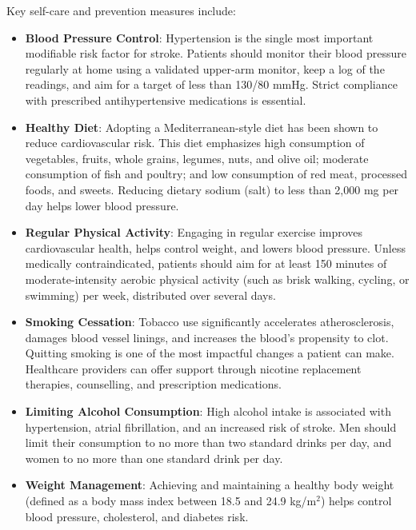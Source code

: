 Key self-care and prevention measures include:

\begin{itemize}
    \item \textbf{Blood Pressure Control}: Hypertension is the single most important modifiable risk factor for stroke. Patients should monitor their blood pressure regularly at home using a validated upper-arm monitor, keep a log of the readings, and aim for a target of less than 130/80 mmHg. Strict compliance with prescribed antihypertensive medications is essential.

    \item \textbf{Healthy Diet}: Adopting a Mediterranean-style diet has been shown to reduce cardiovascular risk. This diet emphasizes high consumption of vegetables, fruits, whole grains, legumes, nuts, and olive oil; moderate consumption of fish and poultry; and low consumption of red meat, processed foods, and sweets. Reducing dietary sodium (salt) to less than 2,000 mg per day helps lower blood pressure.

    \item \textbf{Regular Physical Activity}: Engaging in regular exercise improves cardiovascular health, helps control weight, and lowers blood pressure. Unless medically contraindicated, patients should aim for at least 150 minutes of moderate-intensity aerobic physical activity (such as brisk walking, cycling, or swimming) per week, distributed over several days.

    \item \textbf{Smoking Cessation}: Tobacco use significantly accelerates atherosclerosis, damages blood vessel linings, and increases the blood's propensity to clot. Quitting smoking is one of the most impactful changes a patient can make. Healthcare providers can offer support through nicotine replacement therapies, counselling, and prescription medications.

    \item \textbf{Limiting Alcohol Consumption}: High alcohol intake is associated with hypertension, atrial fibrillation, and an increased risk of stroke. Men should limit their consumption to no more than two standard drinks per day, and women to no more than one standard drink per day.

    \item \textbf{Weight Management}: Achieving and maintaining a healthy body weight (defined as a body mass index between 18.5 and 24.9 kg/m$^2$) helps control blood pressure, cholesterol, and diabetes risk.


\end{itemize}
